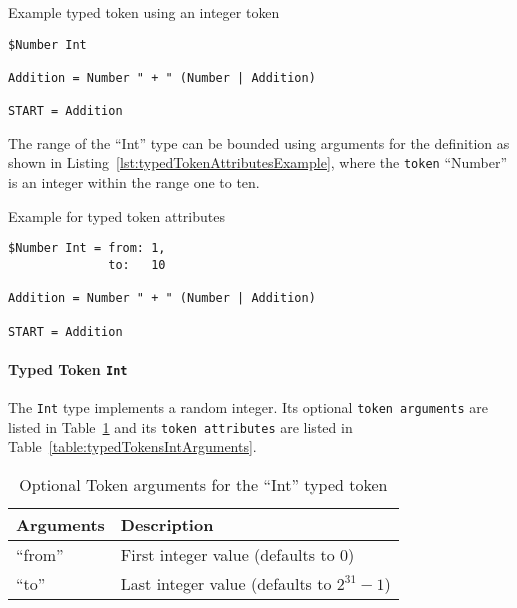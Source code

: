\begin{listing}
\caption{Example typed token using an integer token}
\label{lst:typedTokenExample}
\begin{verbatim}
$Number Int

Addition = Number " + " (Number | Addition)

START = Addition
\end{verbatim}
\end{listing}

The range of the \enquote{Int} type can be bounded using arguments for the definition as shown in Listing~\ref{lst:typedTokenAttributesExample}, where the \texttt{token} \enquote{Number} is an integer within the range one to ten.

\begin{listing}
\caption{Example for typed token attributes}
\label{lst:typedTokenAttributesExample}
\begin{verbatim}
$Number Int = from: 1,
              to:   10

Addition = Number " + " (Number | Addition)

START = Addition
\end{verbatim}
\end{listing}

\paragraph{Typed Token \texttt{Int}}
\label{subsec:typedTokensInt}

The \texttt{Int} type implements a random integer. Its optional \texttt{token arguments} are listed in Table~\ref{table:typedTokensIntOptionalArguments} and its \texttt{token attributes} are listed in Table~\ref{table:typedTokensIntArguments}.

\begin{table}[H]
\caption{Optional Token arguments for the ``Int'' typed token}
\label{table:typedTokensIntOptionalArguments}
\center
\begin{tabular}{| l | l |}
\hline
  \textbf{Arguments}
& \textbf{Description}
\tabularnewline
\hline
  \enquote{from}
& First integer value (defaults to 0)
\tabularnewline
\hline
  \enquote{to}
& Last integer value (defaults to $2^{31} - 1$)
\tabularnewline
\hline
\end{tabular}
\end{table}

